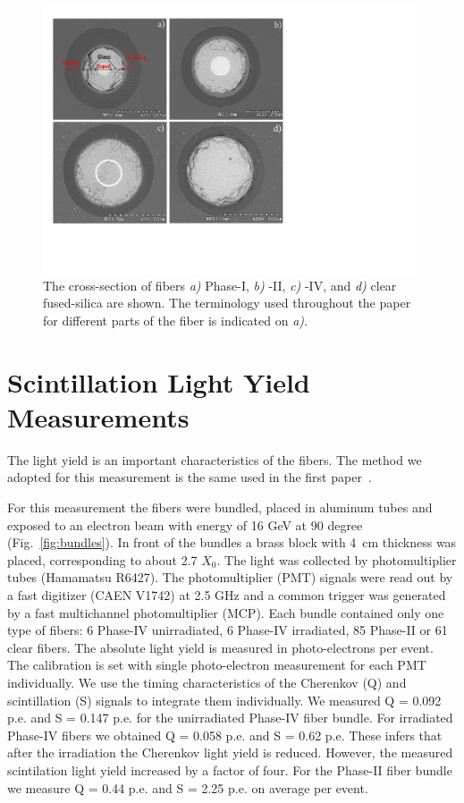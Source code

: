 \documentclass[a4paper,11pt]{article}
\begin{document}
\begin{figure}[ht]
\begin{center}\vspace{-1pc}
      \includegraphics[width=10 cm]{Figures/allfiberimage2.pdf}
\caption{\small The cross-section of fibers
{\it a)} Phase-I,
{\it b)} -II,
{\it c)} -IV, and
{\it d)} clear fused-silica are shown.  The terminology used throughout the paper for different parts of the fiber is indicated on {\it a)}.}
    \label{fig:FiberCrossSections}
\end{center}
\end{figure}

\section{Scintillation Light Yield Measurements}
\label{sec:lightyield}
The light yield is an important characteristics of the fibers. The method we adopted for this measurement is the same used in the first paper~\cite{JINSTPaper}. 

For this measurement the fibers were bundled, placed in aluminum tubes and exposed to an electron beam with energy of 16 GeV at 90 degree (Fig.~\ref{fig:bundles}). In front of the bundles a brass block with 4~cm thickness was placed, corresponding to about 2.7 $X_0$. The light was collected by photomultiplier tubes (Hamamatsu R6427). The photomultiplier (PMT) signals were read out by a fast digitizer (CAEN V1742) at 2.5 GHz and a common trigger was generated by a fast multichannel photomultiplier (MCP). Each bundle contained only one type of fibers: 6 Phase-IV unirradiated, 6 Phase-IV irradiated, 85 Phase-II or 61 clear fibers. The absolute light yield is measured in photo-electrons per event. The calibration is set with single photo-electron measurement for each PMT individually. We use the timing characteristics of the Cherenkov (Q) and scintillation (S) signals to integrate them individually. We measured Q = 0.092 p.e. and S = 0.147 p.e. for the unirradiated Phase-IV fiber bundle. For irradiated Phase-IV fibers we obtained Q = 0.058 p.e. and S = 0.62 p.e. 
These infers that after the irradiation the Cherenkov light yield is reduced. However, the measured scintilation light yield increased by a factor of four. For the Phase-II fiber bundle we measure Q = 0.44 p.e. and S = 2.25 p.e. on average per event.
\end{document}
